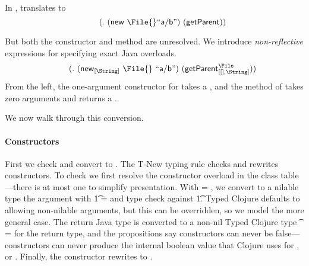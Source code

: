 In , 
translates to
\begin{equation}  \label{eq:unresolved}
  \qquad {\methodexp {\getparent{}} {\newexp {\File{}} {\makestr{a/b}}} {}}
\end{equation}

But both the constructor and method are unresolved.
We introduce \emph{non-reflective} expressions for specifying exact Java overloads.
\begin{equation} \label{eq:resolved}
\qquad {\methodstaticexp {\File} {} {\String} {\getparent{}} {\newstaticexp {\String} {\File{}} {\File{}} {\makestr{a/b}}} {}}
\end{equation}
From the left, the one-argument constructor for \File takes a \String, and the 
\getparent{} method of
\File{} takes zero arguments
and
returns a \String.

We now walk through this conversion.%

\paragraph{Constructors} First we check and convert {\newexp {\File{}} {}} to {\newstaticexp {\String} {\File{}} {\File{}} {}}.
The T-New typing rule checks and rewrites constructors.
To check
{\newexp {\File{}} {}}
we first resolve the constructor overload in the class table---there is at most one
to simplify presentation.
With  = \String,
we convert to a nilable type the argument with \t{1} = \Union{\Nil}{\String}
and type check {} against \t{1}.
Typed Clojure defaults to allowing non-nilable arguments, but this
can be overridden, so we model the more general case.
The return Java type \File is converted to a non-nil
Typed Clojure type \t{} = \File for the return type,
and the propositions say constructors can never be false---constructors
can never produce the internal boolean value that Clojure uses for \false{}, or \nil{}.
Finally, the constructor rewrites to {\newstaticexp {\String} {\File{}} {\File{}} {}}.

